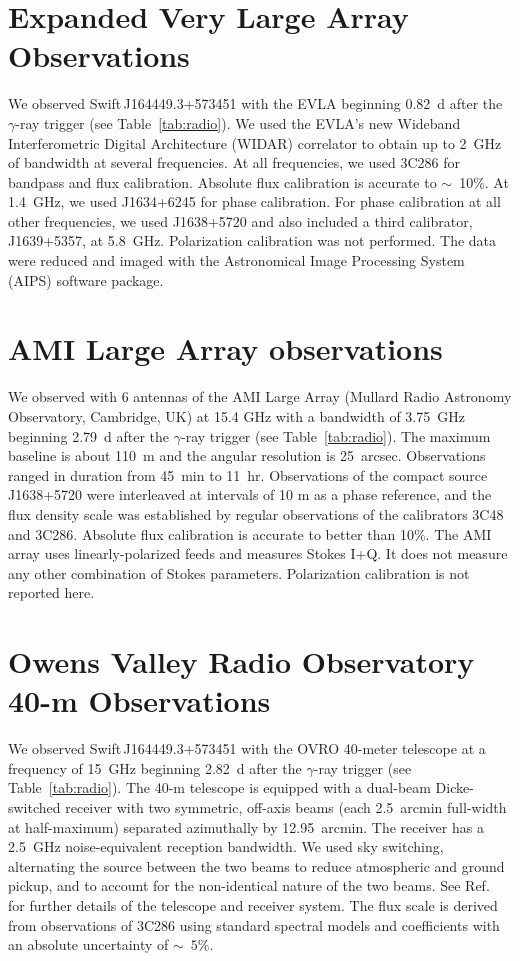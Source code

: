 \section{Expanded Very Large Array Observations}
\label{sec:evla}

We observed Swift\,J164449.3+573451 with the EVLA beginning 0.82~d
after the $\gamma$-ray trigger (see Table~\ref{tab:radio}). We used
the EVLA's new Wideband Interferometric Digital Architecture (WIDAR)
correlator to obtain up to 2~GHz of bandwidth at several frequencies.
At all frequencies, we used 3C286 for bandpass and flux calibration.
Absolute flux calibration is accurate to $\sim$~10$\%$.
At 1.4~GHz, we used J1634+6245 for phase calibration.  For phase
calibration at all other frequencies, we used J1638+5720 and also
included a third calibrator, J1639+5357, at 5.8~GHz.
Polarization calibration was not performed.  The data were
reduced and imaged with the Astronomical Image Processing System
(AIPS) software package.


\section{AMI Large Array observations}
\label{sec:ryle}

We observed with 6 antennas of the AMI Large
Array (Mullard Radio Astronomy Observatory, Cambridge, UK) at 15.4 GHz
with a bandwidth of 3.75~GHz beginning 2.79~d after the $\gamma$-ray
trigger (see Table~\ref{tab:radio}).  The maximum baseline is about
110~m and the angular resolution is 25~arcsec.  Observations ranged in
duration from 45~min to 11~hr.  Observations of the compact source
J1638+5720 were interleaved at intervals of 10 m as a phase reference,
and the flux density scale was established by regular observations of
the calibrators 3C48 and 3C286.  Absolute flux calibration is
accurate to better than 10$\%$.  The AMI array uses linearly-polarized 
feeds and measures Stokes I+Q.  It does not measure any other combination 
of Stokes parameters.  Polarization calibration is not reported here.  

\section{Owens Valley Radio Observatory 40-m Observations}
\label{sec:ovro40}

We observed Swift\,J164449.3+573451 with the OVRO 40-meter telescope
at a frequency of 15~GHz beginning 2.82~d after the $\gamma$-ray
trigger (see Table~\ref{tab:radio}).  The 40-m telescope is equipped
with a dual-beam Dicke-switched receiver with two symmetric, off-axis
beams (each 2.5~arcmin full-width at half-maximum) separated
azimuthally by 12.95~arcmin.  The receiver has a 2.5~GHz
noise-equivalent reception bandwidth.  We used sky switching,
alternating the source between the two beams to reduce atmospheric and
ground pickup, and to account for the non-identical nature of the two
beams.  See Ref.~ for further details of the telescope
and receiver system.  The flux scale is derived from observations of 
3C286 using standard spectral models and coefficients\cite{baars}
 with an absolute uncertainty of $\sim$~$5\%$.

